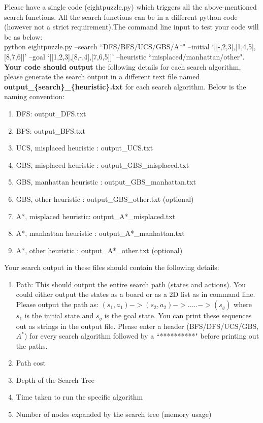 \documentclass{article}
\begin{document}
\noindent Please have a single code (eightpuzzle.py) which triggers all the above-mentioned search functions. All the search functions can be in a different python code (however not a strict requirement).The command line input to test your code will be as below:\\

\noindent python eightpuzzle.py --search ``DFS/BFS/UCS/GBS/A*" --initial `[[-,2,3],[1,4,5],[8,7,6]]' --goal `[[1,2,3],[8,-,4],[7,6,5]]' --heuristic ``misplaced/manhattan/other".\\

\noindent \textbf{Your code should output} the following details for each search algorithm, please generate the search output in a different text file named \textbf{output\_\{search\}\_\{heuristic\}.txt} for each search algorithm. Below is the naming convention:
\begin{enumerate}
\item DFS: output\_DFS.txt

\item BFS: output\_BFS.txt

\item UCS, misplaced heuristic : output\_UCS.txt

\item GBS, misplaced heuristic : output\_GBS\_misplaced.txt

\item GBS, manhattan heuristic : output\_GBS\_manhattan.txt

\item GBS, other heuristic : output\_GBS\_other.txt (optional)

\item A*, misplaced heuristic: output\_A*\_misplaced.txt

\item A*, manhattan heuristic : output\_A*\_manhattan.txt

\item A*, other heuristic : output\_A*\_other.txt (optional)
\end{enumerate}
Your search output in these files should contain the following details:
\begin{enumerate}
    \item  Path: This should output the entire search path (states and actions). You could either output the states as a board or as a 2D list as in command line. Please output the path as: $(s_1,a_1)->(s_2,a_2)->.....->(s_g) $ where $s_1$ is the initial state and $s_g$ is the goal state. You can print these sequences out as strings in the output file. Please enter a header (BFS/DFS/UCS/GBS,$A^*$) for every search algorithm followed by a ``**********" before printing out the paths.
    \item Path cost
    \item Depth of the Search Tree
    \item Time taken to run the specific algorithm
    \item  Number of nodes expanded by the search tree (memory usage)
\end{enumerate}
\end{document}
